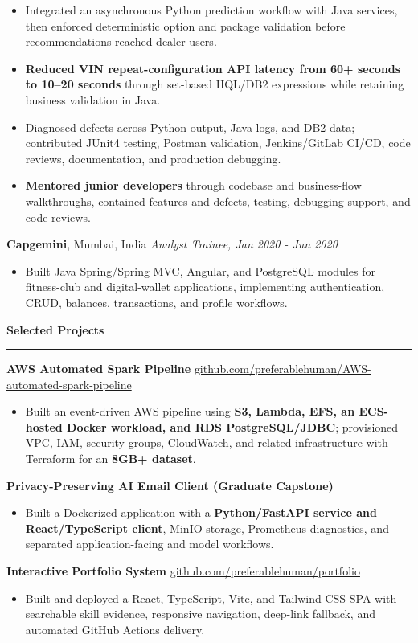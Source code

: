 \documentclass[11pt,letterpaper]{article}
\newcommand{\ressection}[1]{\Needspace{6\baselineskip}\vspace{8pt}\par\textbf{#1}\par\vspace{2pt}\hrule\vspace{5pt}}
\begin{document}
\begin{itemize}
  \item Integrated an asynchronous Python prediction workflow with Java services, then enforced deterministic option and package validation before recommendations reached dealer users.
  \item \textbf{Reduced VIN repeat-configuration API latency from 60+ seconds to 10--20 seconds} through set-based HQL/DB2 expressions while retaining business validation in Java.
  \item Diagnosed defects across Python output, Java logs, and DB2 data; contributed JUnit4 testing, Postman validation, Jenkins/GitLab CI/CD, code reviews, documentation, and production debugging.
  \item \textbf{Mentored junior developers} through codebase and business-flow walkthroughs, contained features and defects, testing, debugging support, and code reviews.
\end{itemize}
\textbf{Capgemini}, Mumbai, India \hfill \textit{Analyst Trainee, Jan 2020 - Jun 2020}
\begin{itemize}
  \item Built Java Spring/Spring MVC, Angular, and PostgreSQL modules for fitness-club and digital-wallet applications, implementing authentication, CRUD, balances, transactions, and profile workflows.
\end{itemize}

\ressection{Selected Projects}
\textbf{AWS Automated Spark Pipeline} \hfill \href{https://github.com/preferablehuman/AWS-automated-spark-pipeline}{github.com/preferablehuman/AWS-automated-spark-pipeline}
\begin{itemize}
  \item Built an event-driven AWS pipeline using \textbf{S3, Lambda, EFS, an ECS-hosted Docker workload, and RDS PostgreSQL/JDBC}; provisioned VPC, IAM, security groups, CloudWatch, and related infrastructure with Terraform for an \textbf{8GB+ dataset}.
\end{itemize}
\vspace{2pt}
\textbf{Privacy-Preserving AI Email Client (Graduate Capstone)}
\begin{itemize}
  \item Built a Dockerized application with a \textbf{Python/FastAPI service and React/TypeScript client}, MinIO storage, Prometheus diagnostics, and separated application-facing and model workflows.
\end{itemize}
\vspace{2pt}
\textbf{Interactive Portfolio System} \hfill \href{https://github.com/preferablehuman/portfolio}{github.com/preferablehuman/portfolio}
\begin{itemize}
  \item Built and deployed a React, TypeScript, Vite, and Tailwind CSS SPA with searchable skill evidence, responsive navigation, deep-link fallback, and automated GitHub Actions delivery.
\end{itemize}
\end{document}
